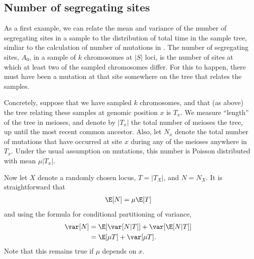 \subsection{Number of segregating sites}

As a first example,
we can relate the mean and variance of the number of segregating sites in a sample
to the distribution of total time in the sample tree, simliar to the calculation of number of mutations in \citep{hudson1990gene}.
The number of segregating sites, $A_0$, in a sample of $k$ chromosomes at $|S|$ loci,
is the number of sites at which at least two of the sampled chromosomes differ.
For this to happen, there must have been a mutation at that site somewhere on the tree that relates the samples.

Concretely, suppose that we have sampled $k$ chromosomes,
and that (as above) the tree relating these samples at genomic position $x$ is $T_x$.
We measure ``length'' of the tree in meioses,
and denote by $|T_x|$ the total number of meioses the tree,
up until the most recent common ancestor.
Also, let $N_x$ denote the total number of mutations that have occurred at site $x$ during any of the meioses anywhere in $T_x$.
Under the usual assumption on mutations,
this number is Poisson distributed with mean $\mu |T_x|$.

Now let $X$ denote a randomly chosen locus,
$T = |T_X|$, and $N = N_X$.
It is straightforward that
\begin{align}
  \E[N] = \mu \E[T]
\end{align}
and using the formula for conditional partitioning of variance,
\begin{align}
  \var[N] &= \E[ \var[N|T] ] + \var[ \E[N|T] ] \\
    &= \E[ \mu T ] + \var[ \mu T ] .
\end{align}
Note that this remains true if $\mu$ depends on $x$.

